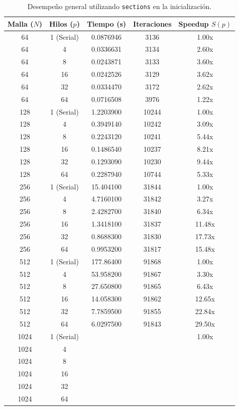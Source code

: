 \documentclass[11pt,a4paper]{article}
\begin{document}
\begin{table}[H]
\centering
\renewcommand{\arraystretch}{1.2}
\small
\begin{tabular}{|c|c|c|c|c|}
\hline
\textbf{Malla ($N$)} & \textbf{Hilos ($p$)} & \textbf{Tiempo (s)} & \textbf{Iteraciones} & \textbf{Speedup $S(p)$} \\ \hline
64 & 1 (Serial) & 0.0876946 & 3136 & 1.00x \\ 
64 & 4 & 0.0336631 & 3134 & 2.60x \\ 
64 & 8 & 0.0243871 & 3133 & 3.60x \\ 
64 & 16 & 0.0242526 & 3129 & 3.62x \\ 
64 & 32 & 0.0334470 & 3172 & 2.62x \\ 
64 & 64 & 0.0716508 & 3976 & 1.22x \\ \hline
128 & 1 (Serial) & 1.2203900 & 10244 & 1.00x \\ 
128 & 4 & 0.3949140 & 10242 & 3.09x \\ 
128 & 8 & 0.2243120 & 10241 & 5.44x \\ 
128 & 16 & 0.1486540 & 10237 & 8.21x \\ 
128 & 32 & 0.1293090 & 10230 & 9.44x \\ 
128 & 64 & 0.2287940 & 10744 & 5.33x \\ \hline
256 & 1 (Serial) & 15.404100 & 31844 & 1.00x \\ 
256 & 4 & 4.7160100 & 31842 & 3.27x \\ 
256 & 8 & 2.4282700 & 31840 & 6.34x \\ 
256 & 16 & 1.3418100 & 31837 & 11.48x \\ 
256 & 32 & 0.8688300 & 31830 & 17.73x \\ 
256 & 64 & 0.9953200 & 31817 & 15.48x \\ \hline
512 & 1 (Serial) & 177.86400 & 91868 & 1.00x \\ 
512 & 4 & 53.958200 & 91867 & 3.30x \\ 
512 & 8 & 27.650800 & 91865 & 6.43x \\ 
512 & 16 & 14.058300 & 91862 & 12.65x \\ 
512 & 32 & 7.7859500 & 91855 & 22.84x \\ 
512 & 64 & 6.0297500 & 91843 & 29.50x \\ \hline
1024 & 1 (Serial) & & & 1.00x \\ 
1024 & 4 & & & \\ 
1024 & 8 & & & \\ 
1024 & 16 & & & \\ 
1024 & 32 & & & \\ 
1024 & 64 & & & \\ \hline
\end{tabular}
\caption{Desempeño general utilizando \texttt{sections} en la inicialización.}
\label{tab:resultados_sections}
\end{table}
\end{document}
